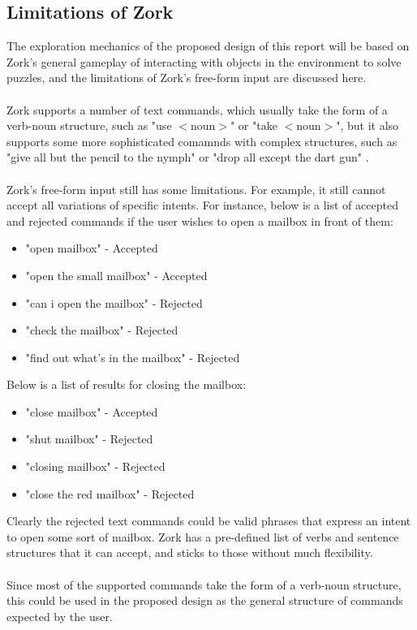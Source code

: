 \documentclass[12pt]{article}
\begin{document}
\subsection{Limitations of Zork}

The exploration mechanics of the proposed design of this report will be based on Zork's general gameplay of interacting with objects in the environment to solve puzzles, and the limitations of Zork's free-form input are discussed here.
\\
\\
Zork supports a number of text commands, which usually take the form of a verb-noun structure, such as "use $<$noun$>$" or "take $<$noun$>$", but it also supports some more sophisticated comamnds with complex structures, such as "give all but the pencil to the nymph" or "drop all except the dart gun" \cite{RefWorks:36}.
\\
\\
Zork's free-form input still has some limitations. For example, it still cannot accept all variations of specific intents. For instance, below is a list of accepted and rejected commands if the user wishes to open a mailbox in front of them:
\begin{itemize}
	\item "open mailbox" - Accepted
	\item "open the small mailbox" - Accepted
	\item "can i open the mailbox" - Rejected
	\item "check the mailbox" - Rejected
	\item "find out what's in the mailbox" - Rejected
\end{itemize}
Below is a list of results for closing the mailbox:
\begin{itemize}
	\item "close mailbox" - Accepted
	\item "shut mailbox" - Rejected
	\item "closing mailbox" - Rejected
	\item "close the red mailbox" - Rejected
\end{itemize}
Clearly the rejected text commands could be valid phrases that express an intent to open some sort of mailbox. Zork has a pre-defined list of verbs and sentence structures that it can accept, and sticks to those without much flexibility.
\\
\\
Since most of the supported commands take the form of a verb-noun structure, this could be used in the proposed design as the general structure of commands expected by the user.
\end{document}
